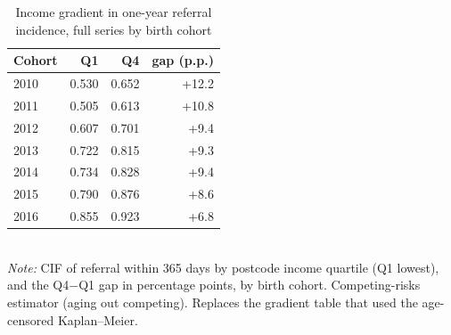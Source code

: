 \begin{table}[htbp]\centering
\caption{Income gradient in one-year referral incidence, full series by birth cohort}
\label{tab:P2grad}
\footnotesize
\setlength{\tabcolsep}{4pt}
\begin{tabular}{lrrr}
\toprule
Cohort & Q1 & Q4 & gap (p.p.) \\
\midrule
2010 & 0.530 & 0.652 & +12.2 \\
2011 & 0.505 & 0.613 & +10.8 \\
2012 & 0.607 & 0.701 & +9.4 \\
2013 & 0.722 & 0.815 & +9.3 \\
2014 & 0.734 & 0.828 & +9.4 \\
2015 & 0.790 & 0.876 & +8.6 \\
2016 & 0.855 & 0.923 & +6.8 \\
\bottomrule
\end{tabular}
\\[3pt]{\footnotesize \textit{Note:} CIF of referral within 365 days by postcode income quartile (Q1 lowest), and the Q4$-$Q1 gap in percentage points, by birth cohort. Competing-risks estimator (aging out competing). Replaces the gradient table that used the age-censored Kaplan--Meier.}
\end{table}
